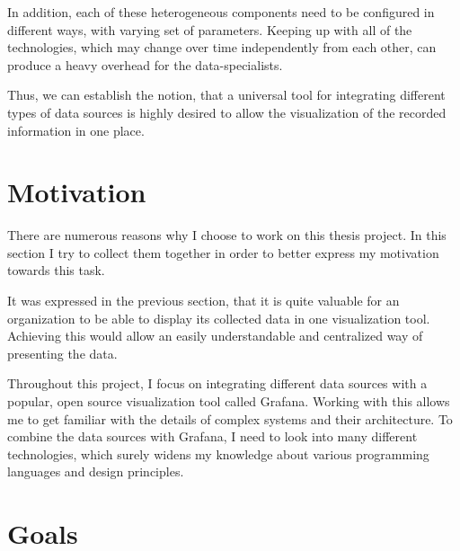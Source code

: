 In addition, each of these heterogeneous components need to be configured in different ways, with varying set of parameters. Keeping up with all of the technologies, which may change over time independently from each other,  can produce a heavy overhead for the data-specialists.

Thus, we can establish the notion, that a universal tool for integrating different types of data sources is highly desired to allow the visualization of the recorded information in one place.

\section{Motivation}


There are numerous reasons why I choose to work on this thesis project. In this section I try to collect them together in order to better express my motivation towards this task.

It was expressed in the previous section, that it is quite valuable for an organization to be able to display its collected data in one visualization tool. Achieving this would allow an easily understandable and centralized way of presenting the data.

Throughout this project, I focus on integrating different data sources with a popular, open source visualization tool called Grafana. Working with this allows me to get familiar with the details of complex systems and their architecture. To combine the data sources with Grafana, I need to look into many different technologies, which surely widens my knowledge about various programming languages and design principles.

\section{Goals} \label{goals}

